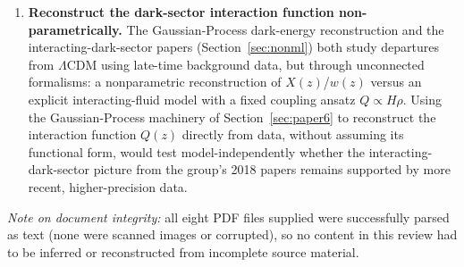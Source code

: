 \documentclass[11pt]{article}
\begin{document}
\begin{enumerate}[leftmargin=1.4em]
\item \textbf{Reconstruct the dark-sector interaction function non-parametrically.} The Gaussian-Process dark-energy reconstruction \citep{bernardo2022parametric} and the interacting-dark-sector papers (Section~\ref{sec:nonml}) both study departures from $\Lambda$CDM using late-time background data, but through unconnected formalisms: a nonparametric reconstruction of $X(z)$/$w(z)$ versus an explicit interacting-fluid model with a fixed coupling ansatz $Q\propto H\rho$. Using the Gaussian-Process machinery of Section~\ref{sec:paper6} to reconstruct the interaction function $Q(z)$ directly from data, without assuming its functional form, would test model-independently whether the interacting-dark-sector picture from the group's 2018 papers remains supported by more recent, higher-precision data.
\end{enumerate}

\bigskip
\noindent \textit{Note on document integrity:} all eight PDF files supplied were successfully parsed as text (none were scanned images or corrupted), so no content in this review had to be inferred or reconstructed from incomplete source material.



\end{document}
